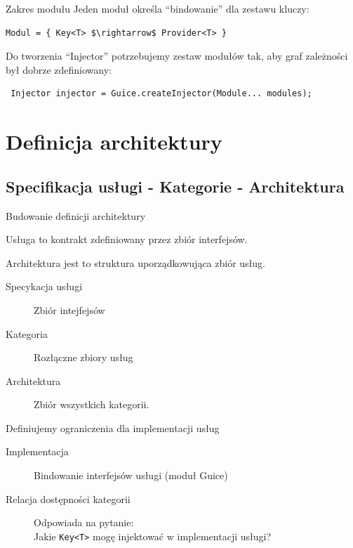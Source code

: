 \documentclass[smaller]{beamer}
\begin{document}
\begin{frame}[fragile]{Zakres modułu}
Jeden moduł określa ``bindowanie'' dla zestawu kluczy:
\begin{lstlisting}[mathescape]
Modul = { Key<T> $\rightarrow$ Provider<T> }
\end{lstlisting}


Do tworzenia ``Injector'' potrzebujemy zestaw modułów tak, aby graf zależności był dobrze zdefiniowany:
\begin{lstlisting}
 Injector injector = Guice.createInjector(Module... modules);
\end{lstlisting}


\end{frame}

\section{Definicja architektury}
\subsection{Specifikacja usługi - Kategorie - Architektura}
\begin{frame}{Budowanie definicji architektury}

Usługa to kontrakt zdefiniowany przez zbiór interfejsów.

\pause

Architektura jest to struktura uporządkowująca zbiór usług.

\begin{description}
 \item[Specykacja usługi] Zbiór intejfejsów
 \item[Kategoria] Rozłączne zbiory usług 
 \item[Architektura] Zbiór wszystkich kategorii.
\end{description}

\pause
Definiujemy ograniczenia dla implementacji usług

\begin{description}
 \item[Implementacja] Bindowanie interfejsów usługi  (moduł Guice)
 \item[Relacja dostępności kategorii] Odpowiada na pytanie: \hfill \\
 Jakie \lstinline|Key<T>| mogę injektować w implementacji usługi?
\end{description}
\end{frame}
\end{document}
